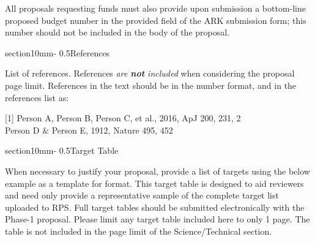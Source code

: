 \documentclass[letterpaper,12pt]{article}
\makeatletter
\renewcommand{\section}{\@startsection%
{section}{1}{0mm}{-\baselineskip}%
{0.5\baselineskip}{\normalfont\Large\bfseries}}%
\makeatother
\begin{document}
\noindent All proposals requesting funds must also provide upon submission a bottom-line proposed budget number in the provided field of the ARK submission form; this number should not be included in the body of the proposal.


\section{References}

List of references. References {\it are {\bf not} included} when considering the
proposal page limit. References in the text should be in the number format, and in the references list as:

[1] Person A, Person B, Person C, et al., 2016, ApJ 200, 231, 2\\
[2] Person D \& Person E, 1912, Nature 495, 452


\section{Target Table}

When necessary to justify your proposal, provide a list of targets using the below example as a template for format. This target table is designed to aid reviewers and need only provide a representative sample of the complete target list uploaded to RPS. Full target tables should be submitted electronically with the Phase-1 proposal. Please limit any target table included here to only 1 page. The table is not included in the page limit of the Science/Technical section. 
\end{document}
